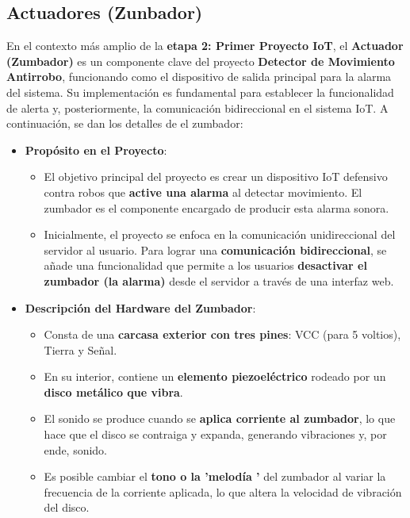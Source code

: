 \documentclass{report}
\begin{document}
\subsection{Actuadores (Zunbador)}
En el contexto más amplio de la \textbf{etapa 2: Primer Proyecto IoT}, el \textbf{Actuador (Zumbador)} es un componente clave del proyecto 
\textbf{Detector de Movimiento Antirrobo}, funcionando como el dispositivo de salida principal para la alarma del sistema. Su implementación es 
fundamental para establecer la funcionalidad de alerta y, posteriormente, la comunicación bidireccional en el sistema IoT. A continuación, se dan 
los detalles de el zumbador:

\begin{itemize}
    \item \textbf{Propósito en el Proyecto}:
    \begin{itemize}
        \item El objetivo principal del proyecto es crear un dispositivo IoT defensivo contra robos que \textbf{active una alarma} al detectar movimiento. 
        El zumbador es el componente encargado de producir esta alarma sonora.
        \item Inicialmente, el proyecto se enfoca en la comunicación unidireccional del servidor al usuario. Para lograr una \textbf{comunicación 
        bidireccional}, se añade una funcionalidad que permite a los usuarios \textbf{desactivar el zumbador (la alarma)} desde el servidor a través de 
        una interfaz web.
    \end{itemize}

    \item \textbf{Descripción del Hardware del Zumbador}:
    \begin{itemize}
        \item Consta de una \textbf{carcasa exterior con tres pines}: VCC (para 5 voltios), Tierra y Señal.
        \item En su interior, contiene un \textbf{elemento piezoeléctrico} rodeado por un \textbf{disco metálico que vibra}.
        \item El sonido se produce cuando se \textbf{aplica corriente al zumbador}, lo que hace que el disco se contraiga y expanda, generando vibraciones y, 
        por ende, sonido.
        \item Es posible cambiar el \textbf{tono o la  'melodía '} del zumbador al variar la frecuencia de la corriente aplicada, lo que altera la 
        velocidad de vibración del disco.
    \end{itemize}


\end{itemize}
\end{document}
